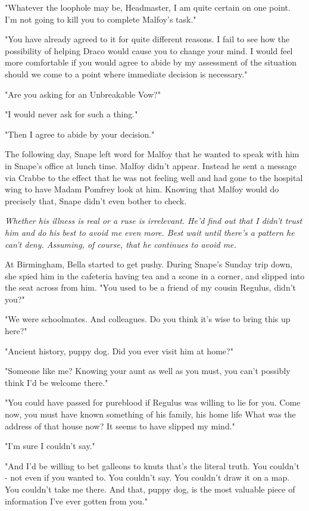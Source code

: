 "Whatever the loophole may be, Headmaster, I am quite certain on one point. I'm not going to kill you to complete Malfoy's task."

"You have already agreed to it for quite different reasons. I fail to see how the possibility of helping Draco would cause you to change your mind. I would feel more comfortable if you would agree to abide by my assessment of the situation should we come to a point where immediate decision is necessary."

"Are you asking for an Unbreakable Vow?"

"I would never ask for such a thing."

"Then I agree to abide by your decision."

The following day, Snape left word for Malfoy that he wanted to speak with him in Snape's office at lunch time. Malfoy didn't appear. Instead he sent a message via Crabbe to the effect that he was not feeling well and had gone to the hospital wing to have Madam Pomfrey look at him. Knowing that Malfoy would do precisely that, Snape didn't even bother to check.

\emph{Whether his illness is real or a ruse is irrelevant. He'd find out that I didn't trust him and do his best to avoid me even more. Best wait until there's a pattern he can't deny. Assuming, of course, that he continues to avoid me.}

At Birmingham, Bella started to get pushy. During Snape's Sunday trip down, she spied him in the cafeteria having tea and a scone in a corner, and slipped into the seat across from him. "You used to be a friend of my cousin Regulus, didn't you?"

"We were schoolmates. And colleagues. Do you think it's wise to bring this up here?"

"Ancient history, puppy dog. Did you ever visit him at home?"

"Someone like me? Knowing your aunt as well as you must, you can't possibly think I'd be welcome there."

"You could have passed for pureblood if Regulus was willing to lie for you. Come now, you must have known something of his family, his home life{\el} What was the address of that house now? It seems to have slipped my mind."

"I'm sure I couldn't say."

"And I'd be willing to bet galleons to knuts that's the literal truth. You couldn't - not even if you wanted to. You couldn't say. You couldn't draw it on a map. You couldn't take me there. And that, puppy dog, is the most valuable piece of information I've ever gotten from you."

